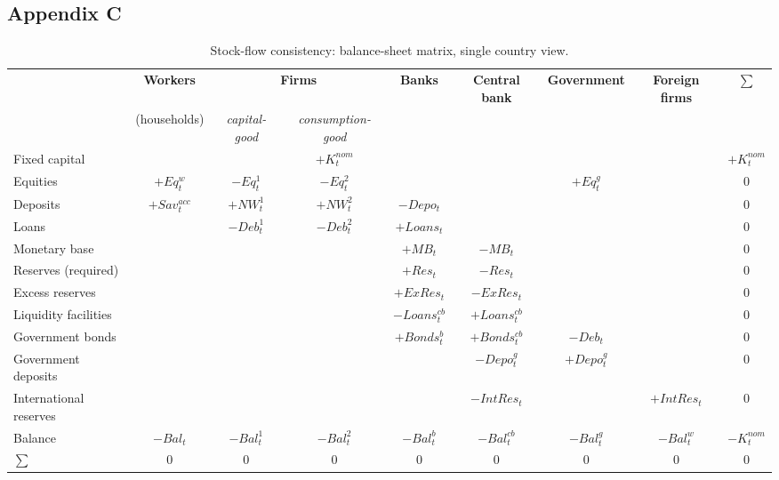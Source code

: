 \documentclass[a4paper,11pt]{article}
\begin{document}
\begin{appendices}
\section*{Appendix C}
\label{appendixC}

\begin{landscape}
\begin{table}
\centering
\small
\renewcommand{\arraystretch}{1.8}
\begin{tabular}{l|c|c|c|c|c|c|c|c}
\toprule
						& \textbf{Workers}		& \multicolumn{2}{c|}{\textbf{Firms}}				& \textbf{Banks}	& \textbf{Central bank}	& \textbf{Government}	& \textbf{Foreign firms}	& \textbf{$\sum$} \\
						& (households)			& \textit{capital-good}	& \textit{consumption-good}	&					& 						&						&							& \\
\hline
Fixed capital			&						&						& $+K^{nom}_t$				&					&						&						&							& $+K^{nom}_t$ \\
Equities				& $+Eq^w_t$				& $-Eq^1_t$				& $-Eq^2_t$					&					&						& $+Eq^g_t$				&							& $0$ \\
Deposits				& $+Sav^{acc}_t$		& $+NW^1_t$				& $+NW^2_t$					& $-Depo_t$			&						&						&							& $0$ \\
Loans					&						& $-Deb^1_t$			& $-Deb^2_t$				& $+Loans_t$		&						&						&							& $0$ \\
Monetary base			&						&						&							& $+MB_t$			& $-MB_t$				&						&							& $0$ \\
Reserves (required)		&						&						&							& $+Res_t$			& $-Res_t$				&						&							& $0$ \\
Excess reserves			&						&						&							& $+ExRes_t$		& $-ExRes_t$			&						&							& $0$ \\
Liquidity facilities	&						&						&							& $-Loans^{cb}_t$	& $+Loans^{cb}_t$		&						&							& $0$ \\
Government bonds		&						& 						&							& $+Bonds^b_t$		& $+Bonds^{cb}_t$		& $-Deb_t$				&							& $0$ \\
Government deposits		&						& 						&							&					& $-Depo^g_t$			& $+Depo^g_t$			&							& $0$ \\
International reserves	&						& 						&							&					& $-IntRes_t$			&						& $+IntRes_t$				& $0$ \\
\hline
Balance					& $-Bal_t$				& $-Bal^1_t$			& $-Bal^2_t$				& $-Bal^b_t$		& $-Bal^{cb}_t$			& $-Bal^g_t$			& $-Bal^w_t$				& $-K^{nom}_t$ \\
\hline
$\sum$					& $0$					& $0$					& $0$						& $0$				& $0$					& $0$					& $0$						& $0$ \\
\bottomrule
\end{tabular}%
\caption{Stock-flow consistency: balance-sheet matrix, single country view.}
\label{tab:SFC1-0.2}
\end{table}
\end{landscape}



\end{appendices}
\end{document}
